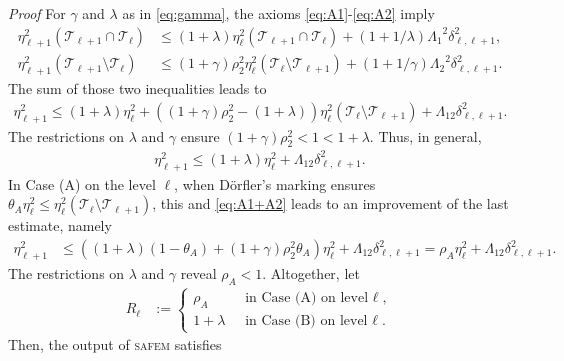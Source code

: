 \documentclass{siamltex1213}
\begin{document}
\textit{Proof}
		For $\gamma$ and $\lambda$ as in \eqref{eq:gamma}, the axioms \eqref{eq:A1}-\eqref{eq:A2} imply 
		\begin{align*}
			\eta_{\ell+1}^2({\mathcal T_{{\ell+1}}} \cap {\mathcal T_{\ell}})  &\leq (1+\lambda) \eta_\ell^2({\mathcal T_{{\ell+1}}} \cap {\mathcal T_{\ell}}) + (1+1/\lambda) {\ensuremath{\Lambda_{\mathrm{1}}}}^2 \delta^2_{\ell,\ell+1}, \\ 
			\eta_{\ell+1}^2({\mathcal T_{{\ell+1}}} \setminus {\mathcal T_{\ell}}) &\leq (1+\gamma)\rho_{2}^2\eta_{\ell}^2({\mathcal T_{\ell}} \setminus {\mathcal T_{{\ell+1}}}) + (1+1/\gamma){\ensuremath{\Lambda_{\mathrm{2}}}}^2 \delta^2_{\ell,\ell+1}. 
		\end{align*}
		The sum of those two inequalities leads to
		\begin{align}\label{eq:A1+A2}
			\eta_{\ell+1}^2 \leq (1+\lambda) \eta_\ell^2  + ((1+\gamma)\rho_{2}^2-(1+\lambda))\eta_{\ell}^2({\mathcal T_{\ell}} \setminus {\mathcal T_{{\ell+1}}}) +  {\ensuremath{\Lambda_{\mathrm{12}}}} \delta^2_{\ell,\ell+1}.
		\end{align}
		The restrictions on $\lambda$ and $\gamma$ ensure $(1+\gamma)\rho_{2}^2<1<1+\lambda $. 
		Thus, in general,
		\begin{align*}
			\eta_{\ell+1}^2\leq (1+\lambda)\eta_\ell^2 + {\ensuremath{\Lambda_{\mathrm{12}}}} \delta^2_{\ell,\ell+1}.
		\end{align*}
		In Case (A) on the level $\ell$, when D\"orfler's marking ensures $ \theta_A \eta_\ell^2 \leq \eta_\ell^2({\mathcal T_{\ell}} \setminus {\mathcal T_{{\ell+1}}})$, this and \eqref{eq:A1+A2} leads to an improvement of the last estimate, namely
		\begin{align*}
			\eta_{\ell+1}^2 &\leq  \left( (1+\lambda)(1-\theta_A)+ (1+\gamma)\rho_2^2\theta_A \right) \eta_{\ell}^2 + {\ensuremath{\Lambda_{\mathrm{12}}}} \delta^2_{\ell,\ell+1}=\rho_A  \eta_{\ell}^2 + {\ensuremath{\Lambda_{\mathrm{12}}}} \delta^2_{\ell,\ell+1}.
		\end{align*}
		The restrictions on $\lambda$ and $\gamma$ reveal $\rho_A <1$. Altogether, let
		\begin{align} \label{eq:LestRed}
			{\ensuremath{R_\ell}}&:= \begin{cases}
			\rho_A & \text{ in Case (A) on level $\ell$},\\
			1+\lambda & \text{ in Case (B) on level $\ell$}.
			\end{cases}
		\end{align}
		Then, the output of {\textsc{safem}\xspace}  satisfies
\end{document}
